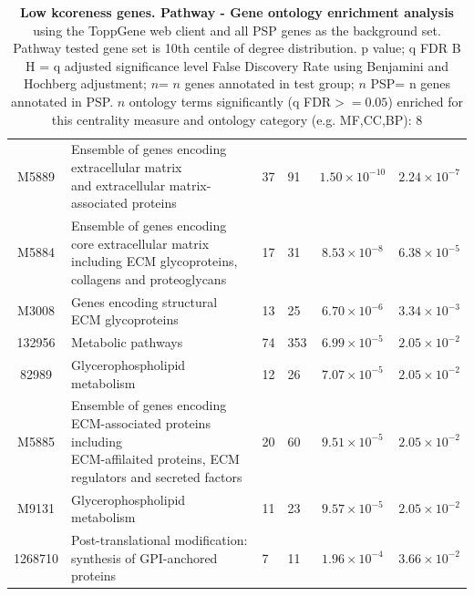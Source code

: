 \begin{table}[ht]
\begin{adjustbox}{width=\textwidth}
\begin{tabular}{@{}clllcl@{}}
  \midrule
M5889 & \makecell{Ensemble of genes encoding extracellular matrix\\ and extracellular matrix-associated proteins}  & 37 & 91 & $1.50 \times 10^{-10}$ & $2.24 \times 10^{-7}$ \\ 
  M5884 & \makecell{Ensemble of genes encoding core extracellular matrix\\ including ECM glycoproteins, collagens and proteoglycans} & 17 & 31 & $8.53 \times 10^{-8}$ & $6.38 \times 10^{-5}$ \\ 
  M3008 & Genes encoding structural ECM glycoproteins & 13 & 25 & $6.70 \times 10^{-6}$ & $3.34 \times 10^{-3}$ \\ 
  132956 & Metabolic pathways & 74 & 353 & $6.99 \times 10^{-5}$ & $2.05 \times 10^{-2}$ \\ 
  82989 & Glycerophospholipid metabolism & 12 & 26 & $7.07 \times 10^{-5}$ & $2.05 \times 10^{-2}$ \\ 
  M5885 & \makecell{Ensemble of genes encoding ECM-associated proteins including\\ ECM-affilaited proteins, ECM regulators and secreted factors} & 20 & 60 & $9.51 \times 10^{-5}$ & $2.05 \times 10^{-2}$ \\ 
  M9131 & Glycerophospholipid metabolism & 11 & 23 & $9.57 \times 10^{-5}$ & $2.05 \times 10^{-2}$ \\ 
  1268710 & Post-translational modification: synthesis of GPI-anchored proteins & 7 & 11 & $1.96 \times 10^{-4}$ & $3.66 \times 10^{-2}$ \\ 
   \hline
\end{tabular}
\end{adjustbox}
\caption[Gene ontology enrichment Low kcoreness genes Pathway of genes above 90th centile of distribution]{\textbf{Low kcoreness genes. Pathway - Gene ontology enrichment analysis} using the ToppGene web client and all PSP genes as the background set.  Pathway tested gene set is 10th centile of degree distribution.  p value; q FDR B H = q adjusted significance level False Discovery Rate using Benjamini and Hochberg adjustment; $n$= $n$ genes annotated in test group; $n$ PSP= n genes annotated in PSP. $n$ ontology terms significantly (q FDR$>=0.05$) enriched for this centrality measure and ontology category (e.g. MF,CC,BP): 8} 
\label{tab:ToppGENE Pathway. kco 10 centile cwpsp.txtp = p value; q FDR B H = q adjusted significance level False Discovery Rate using Benjamini and Hochberg adjustment; n= n genes annotated in test group; n PSP= n genes annotated in PSP. n significant in category 8}
\end{table}
